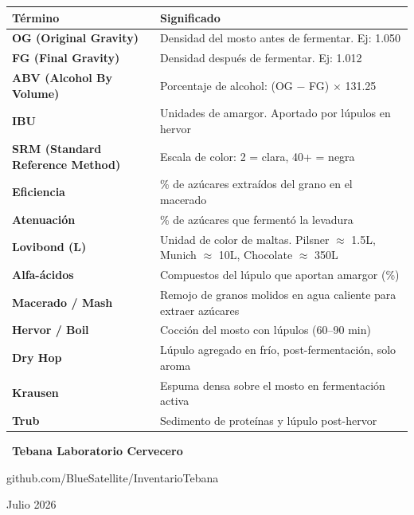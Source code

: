 \documentclass[11pt,a4paper]{report}
\begin{document}
\begin{center}
\begin{tabular}{>{\bfseries}lp{9cm}}
\toprule
Término & Significado \\
\midrule
OG (Original Gravity) & Densidad del mosto antes de fermentar. Ej: 1.050 \\
FG (Final Gravity) & Densidad después de fermentar. Ej: 1.012 \\
ABV (Alcohol By Volume) & Porcentaje de alcohol: (OG $-$ FG) $\times$ 131.25 \\
IBU & Unidades de amargor. Aportado por lúpulos en hervor \\
SRM (Standard Reference Method) & Escala de color: 2 = clara, 40+ = negra \\
Eficiencia & \% de azúcares extraídos del grano en el macerado \\
Atenuación & \% de azúcares que fermentó la levadura \\
Lovibond (L) & Unidad de color de maltas. Pilsner $\approx$ 1.5L, Munich $\approx$ 10L, Chocolate $\approx$ 350L \\
Alfa-ácidos & Compuestos del lúpulo que aportan amargor (\%) \\
Macerado / Mash & Remojo de granos molidos en agua caliente para extraer azúcares \\
Hervor / Boil & Cocción del mosto con lúpulos (60--90 min) \\
Dry Hop & Lúpulo agregado en frío, post-fermentación, solo aroma \\
Krausen & Espuma densa sobre el mosto en fermentación activa \\
Trub & Sedimento de proteínas y lúpulo post-hervor \\
\bottomrule
\end{tabular}
\end{center}

\vfill
\begin{center}
{\large\color{beer}\faBeer\ \textbf{Tebana Laboratorio Cervecero}\ \faBeer}

\medskip
{\small\color{black!50}github.com/BlueSatellite/InventarioTebana}

\smallskip
{\small\color{black!50}Julio 2026}
\end{center}
\end{document}

